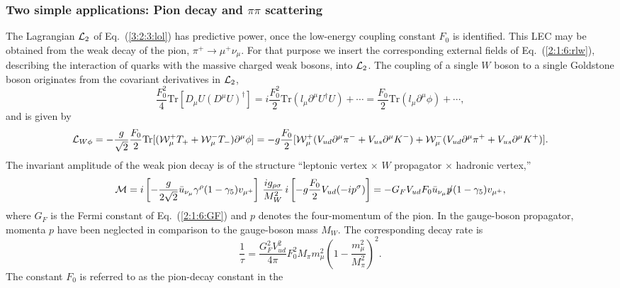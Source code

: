 \documentclass[twoside,12pt]{article}
\begin{document}
\subsubsection{Two simple applications: Pion decay and $\pi\pi$ scattering}
\label{subsubsection_pion_decay_pipi_scattering}
   The Lagrangian ${\cal L}_2$ of Eq.\ (\ref{3:2:3:lol}) has
predictive power, once the low-energy coupling constant $F_0$ is identified.
   This LEC may be obtained from the weak decay of the pion,
$\pi^+\to\mu^+\nu_\mu$.
   For that purpose we insert the corresponding external fields
of Eq.~(\ref{2:1:6:rlw}), describing the interaction of quarks with
the massive charged weak bosons, into ${\cal L}_2$.
   The coupling of a single $W$ boson to a single Goldstone boson
originates from the covariant derivatives in ${\cal L}_2$,
\begin{displaymath}
\frac{F^2_0}{4}\mbox{Tr}[D_\mu U (D^\mu U)^\dagger]
=i\frac{F^2_0}{2}\mbox{Tr}(l_\mu \partial^\mu U^\dagger U)+\cdots
=\frac{F_0}{2}\mbox{Tr}(l_\mu \partial^\mu \phi)+\cdots,
\end{displaymath}
and is given by
\begin{equation}
\label{3:2:4:lwphi} {\cal L}_{W\phi}
= -\frac{g}{\sqrt{2}}\frac{F_0}{2}\mbox{Tr}
[({\cal W}_\mu^+T_+ + {\cal W}^-_\mu T_-)\partial^\mu\phi]
= -g \frac{F_0}{2} [{\cal
W}_\mu^+(V_{ud}\partial^\mu\pi^-+V_{us}\partial^\mu K^-) +{\cal
W}_\mu^-(V_{ud}\partial^\mu \pi^++V_{us}\partial^\mu K^+)].
\end{equation}
   The invariant amplitude of the weak pion decay is of the structure
``leptonic vertex $\times$ $W$ propagator $\times$ hadronic vertex,''
\begin{equation}
\label{3:2:4:minv}
{\cal M}=i\left[-\frac{g}{2\sqrt{2}}\bar{u}_{\nu_\mu} \gamma^\rho
(1-\gamma_5)v_{\mu^+}\right]\,\frac{ig_{\rho\sigma}}{M^2_W}
\,i\left[-g\frac{F_0}{2}V_{ud}
(-ip^\sigma)\right]
=-G_F V_{ud} F_0 \bar{u}_{\nu_\mu} p\hspace{-.4em}/(1-\gamma_5)
v_{\mu^+},
\end{equation}
where $G_F$ is the Fermi constant of Eq.\ (\ref{2:1:6:GF}) and
$p$ denotes the four-momentum of the pion.
   In the gauge-boson propagator, momenta $p$ have been neglected in
comparison to the gauge-boson mass $M_W$.
   The corresponding decay rate is
\begin{displaymath}
\frac{1}{\tau}=\frac{G^2_F V_{ud}^2}{4\pi} F^2_0 M_\pi m_\mu^2
\left(1-\frac{m_\mu^2}{M_\pi^2}\right)^2.
\end{displaymath}
   The constant $F_0$ is referred to as the pion-decay constant in the
\end{document}
